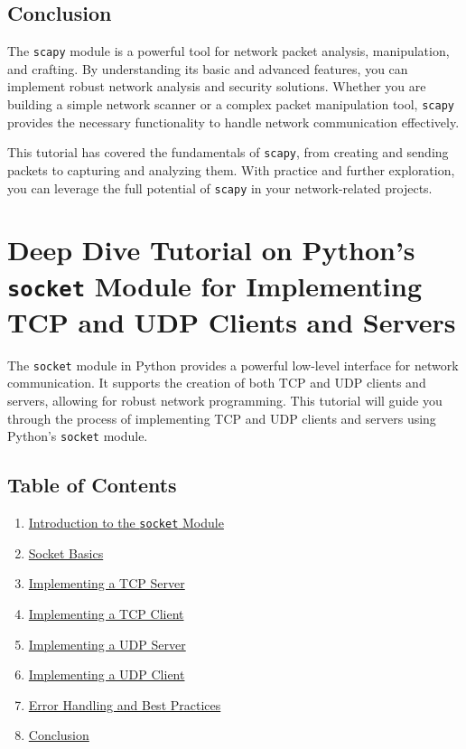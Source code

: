 \documentclass[
  letterpaper,
  DIV=11,
  numbers=noendperiod]{scrreprt}
\providecommand{\tightlist}{%
  \setlength{\itemsep}{0pt}\setlength{\parskip}{0pt}}\usepackage{longtable,booktabs,array}
\begin{document}
\section{Conclusion}\label{conclusion-33}

The \texttt{scapy} module is a powerful tool for network packet
analysis, manipulation, and crafting. By understanding its basic and
advanced features, you can implement robust network analysis and
security solutions. Whether you are building a simple network scanner or
a complex packet manipulation tool, \texttt{scapy} provides the
necessary functionality to handle network communication effectively.

This tutorial has covered the fundamentals of \texttt{scapy}, from
creating and sending packets to capturing and analyzing them. With
practice and further exploration, you can leverage the full potential of
\texttt{scapy} in your network-related projects.


\chapter{\texorpdfstring{Deep Dive Tutorial on Python's \texttt{socket}
Module for Implementing TCP and UDP Clients and
Servers}{Deep Dive Tutorial on Python's socket Module for Implementing TCP and UDP Clients and Servers}}\label{deep-dive-tutorial-on-pythons-socket-module-for-implementing-tcp-and-udp-clients-and-servers}

The \texttt{socket} module in Python provides a powerful low-level
interface for network communication. It supports the creation of both
TCP and UDP clients and servers, allowing for robust network
programming. This tutorial will guide you through the process of
implementing TCP and UDP clients and servers using Python's
\texttt{socket} module.

\section{Table of Contents}\label{table-of-contents-19}

\begin{enumerate}
\def\labelenumi{\arabic{enumi}.}
\tightlist
\item
  \hyperref[introduction-to-the-socket-module]{Introduction to the
  \texttt{socket} Module}
\item
  \hyperref[socket-basics]{Socket Basics}
\item
  \hyperref[implementing-a-tcp-server]{Implementing a TCP Server}
\item
  \hyperref[implementing-a-tcp-client]{Implementing a TCP Client}
\item
  \hyperref[implementing-a-udp-server]{Implementing a UDP Server}
\item
  \hyperref[implementing-a-udp-client]{Implementing a UDP Client}
\item
  \hyperref[error-handling-and-best-practices]{Error Handling and Best
  Practices}
\item
  \hyperref[conclusion]{Conclusion}
\end{enumerate}
\end{document}
